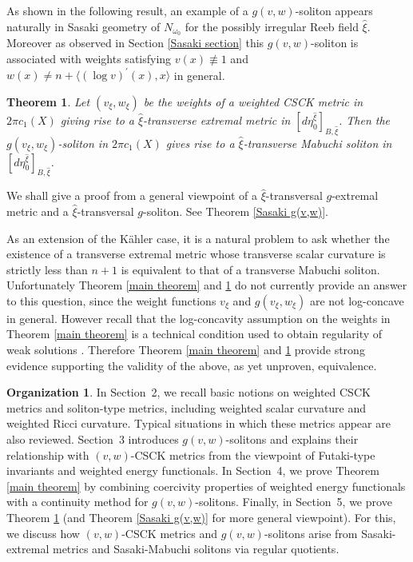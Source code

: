 \documentclass[12pt]{amsart}
\numberwithin{equation}{section}%
\theoremstyle{plain}
\newtheorem{theorem}{Theorem}[section]
\theoremstyle{definition}
\newtheorem*{orga}{\bf{Organization}}
\newcommand{\1}{\mathbf{1}}
\begin{document}
As shown in the following result,
an example of a $g(v,w)$-soliton
appears naturally in Sasaki geometry of $N_{\omega_{0}}$
for the possibly irregular Reeb field $\hat{\xi}$.
Moreover as observed in Section \ref{Sasaki section} 
this $g(v,w)$-soliton is associated with
weights satisfying $v(x)\not\equiv 1$ and
$w(x)\neq n+\langle (\log v)^{\prime}(x),x\rangle$
in general.

\begin{theorem}\label{Sasaki theorem}
Let $(v_{\xi},w_{\xi})$ be the weights of a weighted CSCK metric
in $2\pi c_{1}(X)$ giving rise to a $\hat{\xi}$-transverse 
extremal metric in $[d\eta_{0}^{\hat{\xi}}]_{B,\hat{\xi}}$.
Then the $g(v_{\xi}, w_{\xi})$-soliton in $2\pi c_{1}(X)$
gives rise to a $\hat{\xi}$-transverse Mabuchi soliton
in $[d\eta_{0}^{\hat{\xi}}]_{B,\hat{\xi}}$.
\end{theorem}

We shall give a proof from a general viewpoint of
a $\hat{\xi}$-transversal $g$-extremal metric and 
a $\hat{\xi}$-transversal $g$-soliton.
See Theorem \ref{Sasaki g(v,w)}.

As an extension of the K\"ahler case, 
it is a natural problem to ask whether
the existence of a transverse extremal metric
whose transverse scalar curvature is strictly less than $n+1$
is equivalent to that of a transverse Mabuchi soliton. 
Unfortunately Theorem \ref{main theorem} and \ref{Sasaki theorem}
do not currently provide an answer to this question,
since the weight functions $v_{\xi}$ and $g(v_{\xi},w_{\xi})$
are not log-concave in general.
However recall that the log-concavity assumption on the weights
in Theorem \ref{main theorem} is a technical condition
used to obtain regularity of weak solutions
\cite{DJL24, DJL25, HaLi20, HanLiu25}.
Therefore Theorem \ref{main theorem} and \ref{Sasaki theorem} provide strong 
evidence supporting the validity of the above,
as yet unproven, equivalence.

\begin{orga}
In Section~2, we recall basic notions on weighted CSCK metrics and
soliton-type metrics, including weighted scalar curvature and
weighted Ricci curvature.
Typical situations in which these metrics appear are also reviewed.
Section~3 introduces $g(v,w)$-solitons and explains their relationship
with $(v,w)$-CSCK metrics from the viewpoint of Futaki-type invariants
and weighted energy functionals.
In Section~4, we prove Theorem \ref{main theorem} by combining
coercivity properties of weighted energy functionals with a continuity
method for $g(v,w)$-solitons.
Finally, in Section~5, 
we prove Theorem \ref{Sasaki theorem}
(and Theorem \ref{Sasaki g(v,w)} for more general viewpoint).
For this, we discuss
how $(v,w)$-CSCK metrics and $g(v,w)$-solitons arise from
Sasaki-extremal metrics and Sasaki-Mabuchi solitons via regular quotients.
\end{orga}
\end{document}
